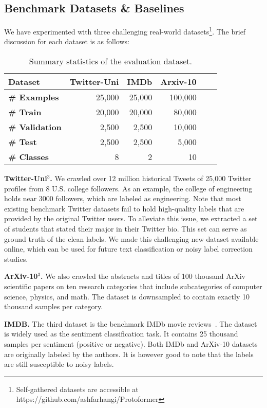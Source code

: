 \documentclass[letterpaper]{article} \usepackage{aaai22}  \usepackage{times}  \usepackage{helvet}  \usepackage{courier}  \usepackage{amsmath,amssymb}
\begin{document}
\subsection{Benchmark Datasets \& Baselines} 

We have experimented with three challenging real-world datasets\footnote{Self-gathered datasets are accessible at 
https://github.com/ashfarhangi/Protoformer}.
The brief discussion for each dataset is as follows:


\begin{table}[!h]
 \centering
 \caption{Summary statistics of the evaluation dataset.}
\begin{tabular}{l|rrrrr} 
\hline
\textbf{Dataset} & \textbf{Twitter-Uni} & \textbf{IMDb} & \textbf{Arxiv-10} \\
\hline \textbf{\# Examples} & 25,000 & 25,000 & 100,000 \\
\textbf{\# Train} & 20,000 & 20,000 & 80,000 \\
\textbf{\# Validation} & 2,500 & 2,500 & 10,000 \\
\textbf{\# Test} & 2,500 & 2,500 & 5,000 \\

\textbf{\# Classes} & 8 & 2 & 10 \\

\hline
\end{tabular}
 
 \label{tab:dataset}
\end{table}

\textbf{Twitter-Uni$^{3}$.} We crawled over 12 million historical Tweets of 25,000 Twitter profiles from 8 U.S. college followers. 
As an example, the college of engineering holds near 3000 followers, which are labeled as engineering. Note that most existing benchmark Twitter datasets fail to hold high-quality labels that are provided by the original Twitter users. To alleviate this issue, we extracted a set
of students that stated their major in their Twitter bio. This set can serve as ground truth of the clean labels. 
We made this challenging new dataset available online, which can be used for future text classification or noisy label correction studies.

\textbf{ArXiv-10$^{3}$.} We also crawled the abstracts and titles of 100 thousand ArXiv scientific papers on ten research categories that include subcategories of computer science, physics, and math. The dataset is downsampled to contain exactly 10 thousand samples per category.

\textbf{IMDB.} The third dataset is the benchmark IMDb movie reviews~\cite{IMDBdataset}. The dataset is widely used as the sentiment classification task. It contains 25 thousand samples per sentiment (positive or negative). Both IMDb and ArXiv-10 datasets are originally labeled by the authors. It is however good to note that the labels are still susceptible to noisy labels.
\end{document}
